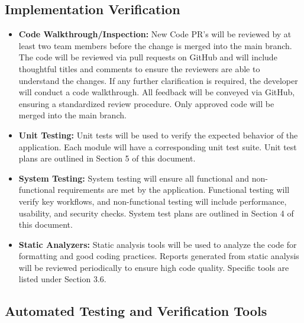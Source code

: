 \documentclass[12pt, titlepage]{article}
\begin{document}



\subsection{Implementation Verification}

\begin{itemize}
  \item \textbf{Code Walkthrough/Inspection:} 
  New Code PR’s will be reviewed by at least two team members before the change is merged into the main branch. 
  The code will be reviewed via pull requests on GitHub and will include thoughtful titles and comments to ensure the reviewers are able to understand the changes. 
  If any further clarification is required, the developer will conduct a code walkthrough. 
  All feedback will be conveyed via GitHub, ensuring a standardized review procedure. 
  Only approved code will be merged into the main branch.

  \item \textbf{Unit Testing:} 
  Unit tests will be used to verify the expected behavior of the application. 
  Each module will have a corresponding unit test suite. 
  Unit test plans are outlined in Section 5 of this document.

  \item \textbf{System Testing:} 
  System testing will ensure all functional and non-functional requirements are met by the application. 
  Functional testing will verify key workflows, and non-functional testing will include performance, usability, and security checks. 
  System test plans are outlined in Section 4 of this document.

  \item \textbf{Static Analyzers:} 
  Static analysis tools will be used to analyze the code for formatting and good coding practices. 
  Reports generated from static analysis will be reviewed periodically to ensure high code quality. 
  Specific tools are listed under Section 3.6.
\end{itemize}

\subsection{Automated Testing and Verification Tools}
\end{document}
